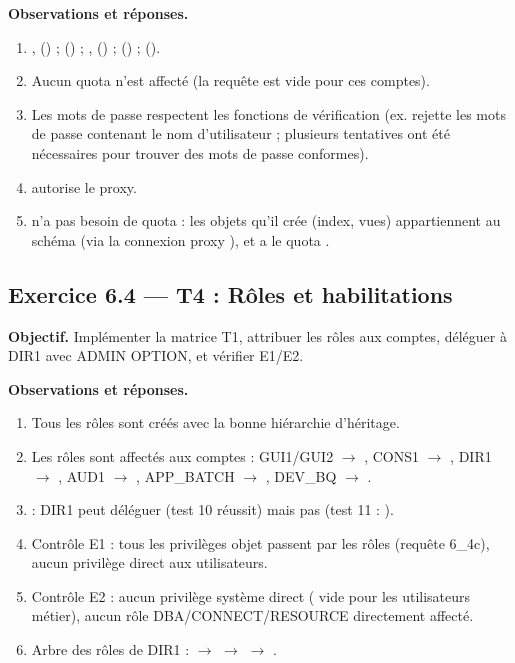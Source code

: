 \textbf{Observations et réponses.}
\begin{enumerate}
  \item {},  () ;  () ;
        ,  () ; 
        () ;  ().
  \item Aucun quota n'est affecté (la requête  est vide pour ces
        comptes).
  \item Les mots de passe respectent les fonctions de vérification (ex. 
        rejette les mots de passe contenant le nom d'utilisateur ; plusieurs tentatives ont
        été nécessaires pour trouver des mots de passe conformes).
  \item {} autorise le proxy.
  \item {} n'a pas besoin de quota : les objets qu'il crée (index, vues)
        appartiennent au schéma  (via la connexion proxy
        ), et  a le quota .
\end{enumerate}

\subsection{Exercice 6.4 — T4 : Rôles et habilitations}
\textbf{Objectif.} Implémenter la matrice T1, attribuer les rôles aux comptes, déléguer
 à DIR1 avec ADMIN OPTION, et vérifier E1/E2.


\textbf{Observations et réponses.}
\begin{enumerate}
  \item Tous les rôles sont créés avec la bonne hiérarchie d'héritage.
  \item Les rôles sont affectés aux comptes : GUI1/GUI2 $\to$ ,
        CONS1 $\to$ , DIR1 $\to$ ,
        AUD1 $\to$ , APP\_BATCH $\to$ ,
        DEV\_BQ $\to$ .
  \item {} : DIR1 peut déléguer
         (test 10 réussit) mais pas 
        (test 11 : ).
  \item Contrôle E1 : tous les privilèges objet passent par les rôles (requête 6\_4c),
        aucun privilège direct aux utilisateurs.
  \item Contrôle E2 : aucun privilège système direct ( vide pour les
        utilisateurs métier), aucun rôle DBA/CONNECT/RESOURCE directement affecté.
  \item Arbre des rôles de DIR1 :
         $\to$  $\to$ 
        $\to$ .
\end{enumerate}

